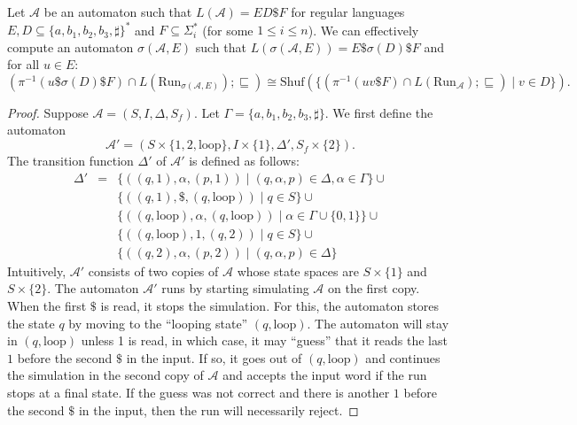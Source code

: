 \documentclass[envcountsame]{llncs}
\newcommand{\A}{\mathcal A}
\newcommand{\Loop}{\mathrm{loop}}
\newcommand{\Run}{\mathrm{Run}}
\newcommand{\Shuf}{\mathrm{Shuf}}
\begin{document}
\begin{lemma}\label{lem:lo_aut_shuf}
Let $\A$ be an automaton such that $L(\A) = E D \$ F$ for
regular languages $E,D \subseteq \{a,b_1,b_2,b_3,\sharp\}^*$ and 
$F \subseteq \Sigma^*_i$ (for some $1\leq i\leq n$).
We can effectively compute an automaton 
$\sigma(\A, E)$ such that $L(\sigma(\A,E)) = E\$ \sigma(D) \$ F$ and for all $u\in E$:
\[
    (\pi^{-1}(u\$ \sigma(D)\$ F) \cap L(\Run_{\sigma(\A,E)}) ; \sqsubseteq)
    \cong \Shuf(\{(\pi^{-1}(u v \$ F) \cap L(\Run_{\A}); \sqsubseteq) \mid v\in D\}).
\]
\end{lemma}
\begin{proof}
Suppose $\A=(S,I,\Delta, S_f)$.  Let $\Gamma = \{a,b_1,b_2,b_3,\sharp\}$.
We first define the automaton 
\[
\A' = (S\times\{1,2,\Loop\}, I\times \{1\},\Delta', S_f\times \{2\}).
\]
The transition function $\Delta'$ of $\A'$ is defined as follows:
\begin{eqnarray*}
    \Delta'  &=& \{((q,1),\alpha,(p,1)) \mid (q,\alpha,p)\in \Delta, \alpha\in\Gamma \} \cup \\
             & & \{((q,1),\$, (q,\Loop)) \mid q \in S  \} \cup \\
             & & \{((q,\Loop), \alpha, (q,\Loop)) \mid \alpha\in \Gamma\cup \{0,1\} \} \cup \\
             & & \{((q,\Loop), 1, (q,2)) \mid q\in S\} \cup \\
             & & \{((q,2),\alpha,(p,2)) \mid (q,\alpha,p)\in \Delta \}
\end{eqnarray*}
Intuitively, $\A'$ consists of two copies of $\A$ whose state spaces
are $S\times \{1\}$ and $S\times \{2\}$.  The automaton $\A'$ runs by
starting simulating $\A$ on the first copy. When the first $\$$ is
read, it stops the simulation. For this, the automaton stores the
state $q$ by moving to the ``looping state'' $(q, \Loop)$. The
automaton will stay in $(q,\Loop)$ unless 1 is read, in which case, it
may ``guess'' that it reads the last $1$ before the second $\$$ in the
input.  If so, it goes out of $(q,\Loop)$ and continues the simulation
in the second copy of $\A$ and accepts the input word if the run stops
at a final state.  If the guess was not correct and there is another
$1$ before the second $\$$ in the input, then the run will necessarily
reject.
 

\end{proof}
\end{document}
